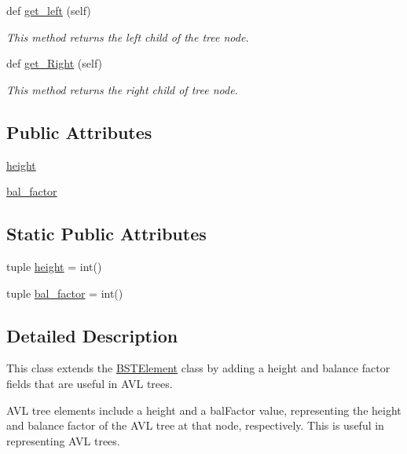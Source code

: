\begin{DoxyCompactItemize}
def \hyperlink{class_a_v_l_tree_element_1_1_a_v_l_tree_element_a448b7a53957a85982ef36e1e828bab4a}{get\+\_\+left} (self)
\begin{DoxyCompactList}\small\item\em This method returns the left child of the tree node. \end{DoxyCompactList}\item 
def \hyperlink{class_a_v_l_tree_element_1_1_a_v_l_tree_element_a07ac5fd29a29b8020e8826c9d00f4a48}{get\+\_\+\+Right} (self)
\begin{DoxyCompactList}\small\item\em This method returns the right child of tree node. \end{DoxyCompactList}\end{DoxyCompactItemize}
\subsection*{Public Attributes}
\begin{DoxyCompactItemize}
\item 
\hyperlink{class_a_v_l_tree_element_1_1_a_v_l_tree_element_acf75c045d479489e7a3add1b547d2624}{height}
\item 
\hyperlink{class_a_v_l_tree_element_1_1_a_v_l_tree_element_a9e11a9ae47fe02077ad1597be21e5403}{bal\+\_\+factor}
\end{DoxyCompactItemize}
\subsection*{Static Public Attributes}
\begin{DoxyCompactItemize}
\item 
tuple \hyperlink{class_a_v_l_tree_element_1_1_a_v_l_tree_element_a6af5676b71ccb44e0f7e1b5a26cd9afc}{height} = int()
\item 
tuple \hyperlink{class_a_v_l_tree_element_1_1_a_v_l_tree_element_a8e6fed7c8e6a2ca9ced0b9289a28fa68}{bal\+\_\+factor} = int()
\end{DoxyCompactItemize}


\subsection{Detailed Description}
This class extends the \hyperlink{namespace_b_s_t_element}{B\+S\+T\+Element} class by adding a height and balance factor fields that are useful in A\+V\+L trees. 

A\+V\+L tree elements include a \textquotesingle{}height\textquotesingle{} and a \textquotesingle{}bal\+Factor\textquotesingle{} value, representing the height and balance factor of the A\+V\+L tree at that node, respectively. This is useful in representing A\+V\+L trees.

